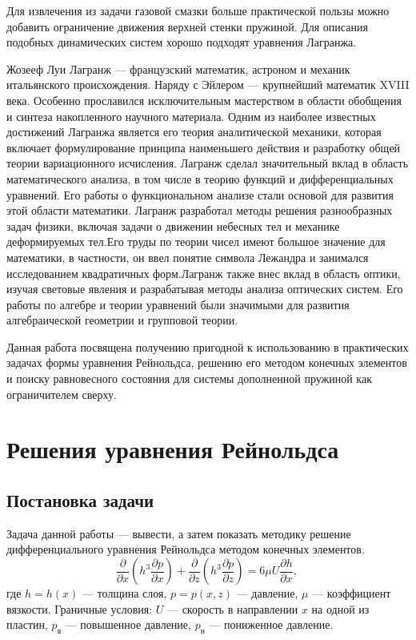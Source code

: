 \documentclass[a4paper,14pt]{extarticle}
\begin{document}
Для извлечения из задачи газовой смазки больше практической пользы можно добавить ограничение движения верхней стенки пружиной. Для описания подобных динамических систем хорошо подходят уравнения Лагранжа.

Жозееф Луи Лагранж --- французский математик, астроном и механик итальянского происхождения. Наряду с Эйлером — крупнейший математик XVIII века. Особенно прославился исключительным мастерством в области обобщения и синтеза накопленного научного материала. Одним из наиболее известных достижений Лагранжа является его теория аналитической механики, которая включает формулирование принципа наименьшего действия и разработку общей теории вариационного исчисления.  Лагранж сделал значительный вклад в область математического анализа, в том числе в теорию функций и дифференциальных уравнений. Его работы о функциональном анализе стали основой для развития этой области математики. Лагранж разработал методы решения разнообразных задач физики, включая задачи о движении небесных тел и механике деформируемых тел.Его труды по теории чисел имеют большое значение для математики, в частности, он ввел понятие символа Лежандра и занимался исследованием квадратичных форм.Лагранж также внес вклад в область оптики, изучая световые явления и разрабатывая методы анализа оптических систем. Его работы по алгебре и теории уравнений были значимыми для развития алгебраической геометрии и групповой теории.

Данная работа посвящена получению пригодной к использованию в практических задачах формы уравнения Рейнольдса, решению его методом конечных элементов и поиску равновесного состояния для системы дополненной пружиной как ограничителем сверху.

\section{Решения уравнения Рейнольдса}

\subsection{Постановка задачи}
Задача данной работы --- вывести, а затем показать методику решение дифференциального уравнения Рейнольдса методом конечных элементов.
\begin{equation}
	\label{reinolts-task}
	\frac{\partial}{\partial x} \left(h^3 \frac{\partial p}{\partial x} \right) + \frac{\partial}{\partial z} \left(h^3 \frac{\partial p}{\partial z} \right) = 6 \mu U \frac{\partial h}{\partial x} \text{, }
\end{equation}
где $h = h(x)$ --- толщина слоя, $p = p(x, z)$ --- давление, $\mu$ --- коэффициент вязкости. Граничные условия: $U$ --- скорость в направлении $x$ на одной из пластин, $p_{\text{в}}$ --- повышенное давление, $p_{\text{н}}$ --- пониженное давление. 
\end{document}
